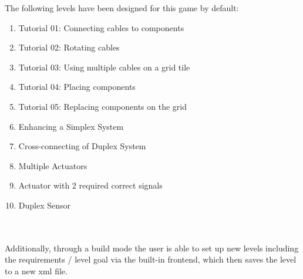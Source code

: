 The following levels have been designed for this game by default:
\begin{enumerate}
    \item Tutorial 01: Connecting cables to components
    \item Tutorial 02: Rotating cables
    \item Tutorial 03: Using multiple cables on a grid tile
    \item Tutorial 04: Placing components
    \item Tutorial 05: Replacing components on the grid
    \item Enhancing a Simplex System
    \item Cross-connecting of Duplex System
    \item Multiple Actuators
    \item Actuator with 2 required correct signals
    \item Duplex Sensor
\end{enumerate}
\\
\\
Additionally, through a build mode the user is able to set up new levels including the requirements / level goal via the built-in
frontend, which then saves the level to a new xml file.

